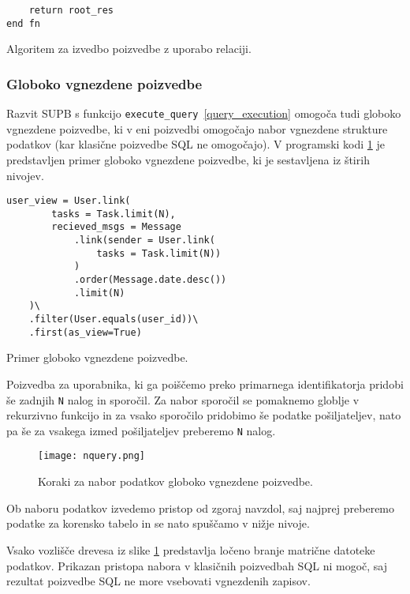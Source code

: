\documentclass[a4paper,12pt,openright]{book}
\begin{document}
\begin{itemize}
\begin{code}
\begin{verbatim}
    return root_res
end fn
\end{verbatim}
\caption{Algoritem za izvedbo poizvedbe z uporabo relaciji.}
\label{execute_query_algorithm}
\end{code}

        \newpage
        \subsubsection{Globoko vgnezdene poizvedbe}

        Razvit SUPB s funkcijo {\tt execute\_query}~\ref{query_execution} omogoča tudi globoko vgnezdene poizvedbe, ki v eni poizvedbi omogočajo nabor vgnezdene strukture podatkov (kar klasične poizvedbe SQL ne omogočajo). V programski kodi \ref{deep_nested_query} je predstavljen primer globoko vgnezdene poizvedbe, ki je sestavljena iz štirih nivojev.

\newpage
\begin{code}
\begin{verbatim}
user_view = User.link(
        tasks = Task.limit(N),
        recieved_msgs = Message
            .link(sender = User.link(
                tasks = Task.limit(N))
            )
            .order(Message.date.desc())
            .limit(N)
    )\
    .filter(User.equals(user_id))\
    .first(as_view=True)
\end{verbatim}
\caption{Primer globoko vgnezdene poizvedbe.}
\label{deep_nested_query}
\end{code}

        Poizvedba za uporabnika, ki ga poiščemo preko primarnega identifikatorja pridobi še zadnjih {\tt N} nalog in sporočil. Za nabor sporočil se pomaknemo globlje v rekurzivno funkcijo in za vsako sporočilo pridobimo še podatke pošiljateljev, nato pa še za vsakega izmed pošiljateljev preberemo {\tt N} nalog.

        \begin{figure}[H]
            \centerline{\texttt{[image: nquery.png]}}
            \caption{Koraki za nabor podatkov globoko vgnezdene poizvedbe.}
            \label{deep_nested_query}
        \end{figure}

        Ob naboru podatkov izvedemo pristop od zgoraj navzdol, saj najprej preberemo podatke za korensko tabelo in se nato spuščamo v nižje nivoje.

        Vsako vozlišče drevesa iz slike \ref{deep_nested_query} predstavlja ločeno branje matrične datoteke podatkov. Prikazan pristopa nabora v klasičnih poizvedbah SQL ni mogoč, saj rezultat poizvedbe SQL ne more vsebovati vgnezdenih zapisov.


\end{itemize}
\end{document}

